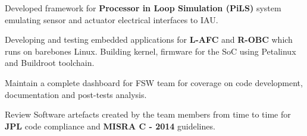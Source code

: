 \begin{cventries}
{\begin{cvitems}
			\item{Developed framework for \textbf{Processor in Loop Simulation (PiLS)} system emulating sensor and actuator electrical interfaces to IAU.}
			\item{Developing and testing embedded applications for \textbf{L-AFC} and \textbf{R-OBC} which runs on barebones Linux. Building kernel, firmware for the SoC using Petalinux and Buildroot toolchain.}
			\item{Maintain a complete dashboard for FSW team for coverage on code development, documentation and post-tests analysis.}
			\item{Review Software artefacts created by the team members from time to time for \textbf{JPL} code compliance and \textbf{MISRA C - 2014} guidelines.}
		\end{cvitems}
	}
\end{cventries}
